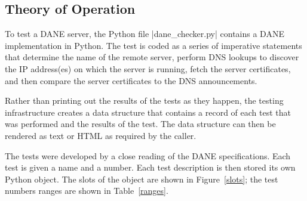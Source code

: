 \documentclass[preprint,3p,11pt]{elsarticle}
\begin{document}
\subsection{Theory of Operation}

To test a DANE server, the Python file |dane_checker.py| contains a
DANE implementation in Python. The test is coded as a series of
imperative statements that determine the name of the remote server,
perform DNS lookups to discover the IP address(es) on which the server
is running, fetch the server certificates, and then compare the server
certificates to the DNS announcements. 

Rather than printing out the results of the tests as they happen, the
testing infrastructure creates a data structure that contains a record
of each test that was performed and the results of the test. The
data structure can then be rendered as text or HTML as required by the
caller. 

The tests were developed by a
close reading of the DANE specifications. Each test is given a name
and a number. Each test description is then stored its own Python
object. The slots of the object are shown in Figure~\ref{slots}; the
test numbers ranges are shown in Table~\ref{ranges}.
\begin{table}
\centering{}
\caption{Slots in the DaneTest object}\label{slots}
\end{table}
\end{document}
